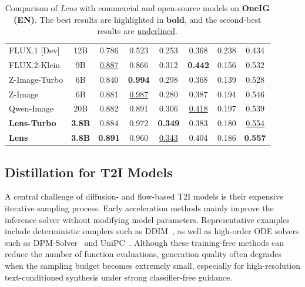 \documentclass{llmxive}
\begin{document}
\begin{table}[t]
{\begin{tabular}{l|c|cccccc}
    FLUX.1 [Dev] & 12B
      & 0.786 & 0.523 & 0.253 & 0.368 & 0.238 & 0.434 \\
    FLUX.2-Klein & 9B
      & \underline{0.887} & 0.866 & 0.312 & \textbf{0.442} & 0.156 & 0.532 \\
    Z-Image-Turbo & 6B
      & 0.840 & \textbf{0.994} & 0.298 & 0.368 & 0.139 & 0.528 \\
    Z-Image & 6B
      & 0.881 & \underline{0.987} & 0.280 & 0.387 & 0.194 & 0.546 \\
    Qwen-Image & 20B
      & 0.882 & 0.891 & 0.306 & \underline{0.418} & 0.197 & 0.539 \\
    \midrule
    \textbf{Lens-Turbo} & \textbf{3.8B}
      & 0.884 & 0.972 & \textbf{0.349} & 0.383 & 0.180 & \underline{0.554} \\
    \textbf{Lens} & \textbf{3.8B}
      & \textbf{0.891} & 0.960 & \underline{0.343} & 0.404 & 0.186 & \textbf{0.557} \\
    \bottomrule
  \end{tabular}%
  }
\caption{Comparison of \textit{Lens} with commercial and open-source models on \textbf{OneIG (EN)}. The best results are highlighted in \textbf{bold}, and the second-best results are \underline{underlined}.}
\end{table}

\subsection{Distillation for T2I Models}

A central challenge of diffusion- and flow-based T2I models is their expensive iterative sampling process. Early acceleration methods mainly improve the inference solver without modifying model parameters. Representative examples include deterministic samplers such as DDIM~\citep{ddim}, as well as high-order ODE solvers such as DPM-Solver~\citep{dpmsolver} and UniPC~\citep{unipc}. Although these training-free methods can reduce the number of function evaluations, generation quality often degrades when the sampling budget becomes extremely small, especially for high-resolution text-conditioned synthesis under strong classifier-free guidance.
\end{document}

